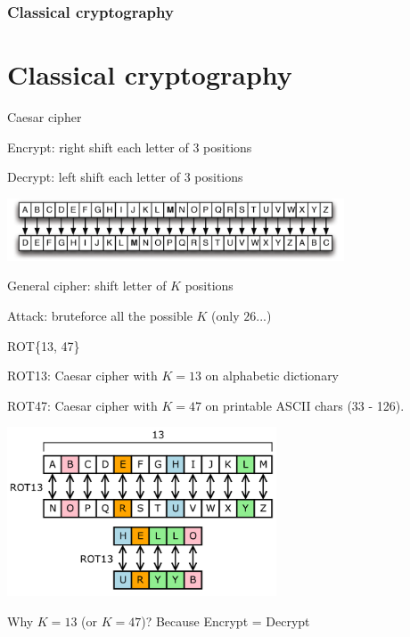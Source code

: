 \section[Section]{Classical cryptography}
\part{Classical cryptography}

\begin{frame}{Caesar cipher}

\centering

\smallskip

Encrypt: right shift each letter of 3 positions

\smallskip

Decrypt: left shift each letter of 3 positions

\medskip

\includegraphics[width=10cm]{img/caesar-shift.png}

\medskip

General cipher: shift letter of $K$ positions

\smallskip

Attack: bruteforce all the possible $K$ (only $26$...)

\end{frame}

\begin{frame}{ROT\{13, 47\}}

\centering

\medskip

ROT13: Caesar cipher with $K = 13$ on alphabetic dictionary

ROT47: Caesar cipher with $K = 47$ on printable ASCII chars (33 - 126).

\medskip

\includegraphics[width=8cm]{img/ROT13.png}

\medskip

Why $K = 13$ (or $K = 47$)? Because Encrypt = Decrypt

\end{frame}

